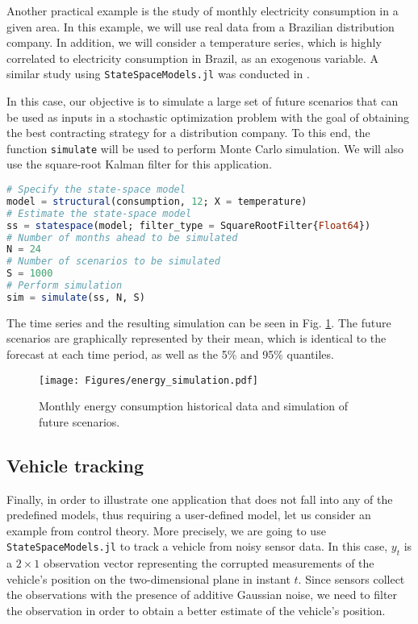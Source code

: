 \documentclass{juliacon}
\begin{document}
Another practical example is the study of monthly electricity consumption in a given area. In this example, we will use real data from a Brazilian distribution company. In addition, we will consider a temperature series, which is highly correlated to electricity consumption in Brazil, as an exogenous variable. A similar study using \texttt{StateSpaceModels.jl} was conducted in \cite{saavedra2018simulating}.

In this case, our objective is to simulate a large set of future scenarios that can be used as inputs in a stochastic optimization problem with the goal of obtaining the best contracting strategy for a distribution company. To this end, the function \texttt{simulate} will be used to perform Monte Carlo simulation. We will also use the square-root Kalman filter for this application.
%
\begin{lstlisting}[language = Julia]
# Specify the state-space model
model = structural(consumption, 12; X = temperature)
# Estimate the state-space model
ss = statespace(model; filter_type = SquareRootFilter{Float64})
# Number of months ahead to be simulated
N = 24
# Number of scenarios to be simulated
S = 1000
# Perform simulation
sim = simulate(ss, N, S)
\end{lstlisting}

The time series and the resulting simulation can be seen in Fig. \ref{fig:energy_simulation}. The future scenarios are graphically represented by their mean, which is identical to the forecast at each time period, as well as the 5\% and 95\% quantiles.
%
\begin{figure}[h]
	\centering
	\texttt{[image: Figures/energy\_simulation.pdf]}
	\caption{Monthly energy consumption historical data and simulation of future scenarios.}
	\label{fig:energy_simulation}
\end{figure}

\subsection{Vehicle tracking}

Finally, in order to illustrate one application that does not fall into any of the predefined models, thus requiring a user-defined model, let us consider an example from control theory. More precisely, we are going to use \texttt{StateSpaceModels.jl} to track a vehicle from noisy sensor data. In this case, $y_t$ is a $2 \times 1$ observation vector representing the corrupted measurements of the vehicle's position on the two-dimensional plane in instant $t$. Since sensors collect the observations with the presence of additive Gaussian noise, we need to filter the observation in order to obtain a better estimate of the vehicle's position.
\end{document}
